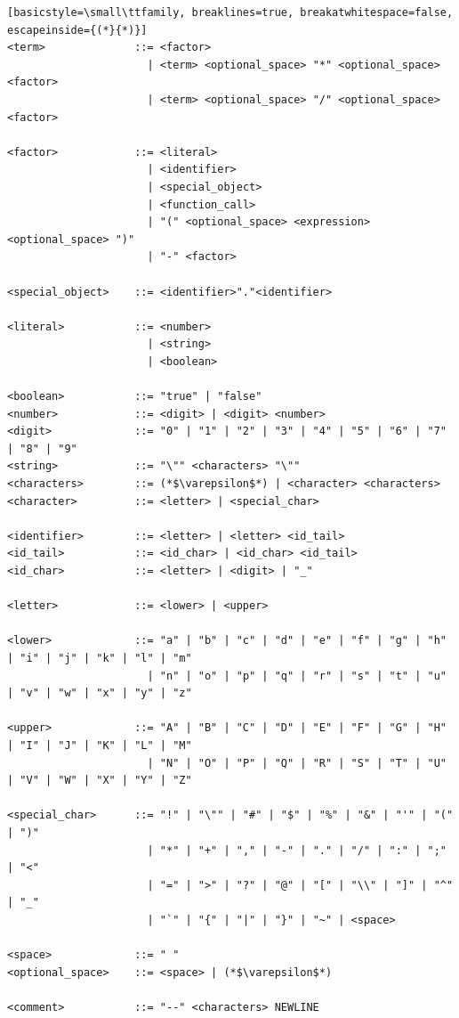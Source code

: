 \begin{lstlisting}[basicstyle=\small\ttfamily, breaklines=true, breakatwhitespace=false, escapeinside={(*}{*)}]
<term>              ::= <factor>
                      | <term> <optional_space> "*" <optional_space> <factor>
                      | <term> <optional_space> "/" <optional_space> <factor>

<factor>            ::= <literal>
                      | <identifier>
                      | <special_object>
                      | <function_call>
                      | "(" <optional_space> <expression> <optional_space> ")"
                      | "-" <factor>

<special_object>    ::= <identifier>"."<identifier>

<literal>           ::= <number>
                      | <string>
                      | <boolean>

<boolean>           ::= "true" | "false"
<number>            ::= <digit> | <digit> <number>
<digit>             ::= "0" | "1" | "2" | "3" | "4" | "5" | "6" | "7" | "8" | "9"
<string>            ::= "\"" <characters> "\""
<characters>        ::= (*$\varepsilon$*) | <character> <characters>
<character>         ::= <letter> | <special_char>

<identifier>        ::= <letter> | <letter> <id_tail>
<id_tail>           ::= <id_char> | <id_char> <id_tail>
<id_char>           ::= <letter> | <digit> | "_"

<letter>            ::= <lower> | <upper>

<lower>             ::= "a" | "b" | "c" | "d" | "e" | "f" | "g" | "h" | "i" | "j" | "k" | "l" | "m"
                      | "n" | "o" | "p" | "q" | "r" | "s" | "t" | "u" | "v" | "w" | "x" | "y" | "z"

<upper>             ::= "A" | "B" | "C" | "D" | "E" | "F" | "G" | "H" | "I" | "J" | "K" | "L" | "M"
                      | "N" | "O" | "P" | "Q" | "R" | "S" | "T" | "U" | "V" | "W" | "X" | "Y" | "Z"

<special_char>      ::= "!" | "\"" | "#" | "$" | "%" | "&" | "'" | "(" | ")" 
                      | "*" | "+" | "," | "-" | "." | "/" | ":" | ";" | "<" 
                      | "=" | ">" | "?" | "@" | "[" | "\\" | "]" | "^" | "_" 
                      | "`" | "{" | "|" | "}" | "~" | <space>

<space>             ::= " "
<optional_space>    ::= <space> | (*$\varepsilon$*)

<comment>           ::= "--" <characters> NEWLINE

\end{lstlisting}